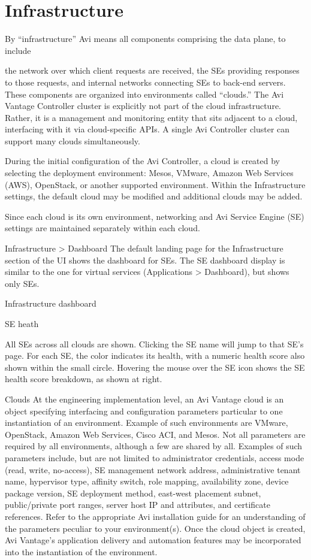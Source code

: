 \documentclass[letterpaper,10pt,english]{sphinxmanual}
\begin{document}
\section{Infrastructure}
\label{\detokenize{getting_started/infrastructure:infrastructure}}\label{\detokenize{getting_started/infrastructure::doc}}
By ``infrastructure'' Avi means all components comprising the data plane, to include

the network over which client requests are received, the SEs providing responses to those requests, and internal networks connecting SEs to back-end servers. These components are organized into environments called ``clouds.'' The Avi Vantage Controller cluster is explicitly not part of the cloud infrastructure. Rather, it is a management and monitoring entity that sits adjacent to a cloud, interfacing with it via cloud-specific APIs. A single Avi Controller cluster can support many clouds simultaneously.

During the initial configuration of the Avi Controller, a cloud is created by selecting the deployment environment: Mesos, VMware, Amazon Web Services (AWS), OpenStack, or another supported environment. Within the Infrastructure settings, the default cloud may be modified and additional clouds may be added.

Since each cloud is its own environment, networking and Avi Service Engine (SE) settings are maintained separately within each cloud.

Infrastructure \textgreater{} Dashboard
The default landing page for the Infrastructure section of the UI shows the dashboard for SEs. The SE dashboard display is similar to the one for virtual services (Applications \textgreater{} Dashboard), but shows only SEs.

Infrastructure dashboard

SE heath

All SEs across all clouds are shown. Clicking the SE name will jump to that SE's page. For each SE, the color indicates its health, with a numeric health score also shown within the small circle. Hovering the mouse over the SE icon shows the SE health score breakdown, as shown at right.

Clouds
At the engineering implementation level, an Avi Vantage cloud is an object specifying interfacing and configuration parameters particular to one instantiation of an environment. Example of such environments are VMware, OpenStack, Amazon Web Services, Cisco ACI, and Mesos. Not all parameters are required by all environments, although a few are shared by all. Examples of such parameters include, but are not limited to administrator credentials, access mode (read, write, no-access), SE management network address, administrative tenant name, hypervisor type, affinity switch, role mapping, availability zone, device package version, SE deployment method, east-west placement subnet, public/private port ranges, server host IP and attributes, and certificate references. Refer to the appropriate Avi installation guide for an understanding of the parameters peculiar to your environment(s). Once the cloud object is created, Avi Vantage's application delivery and automation features may be incorporated into the instantiation of the environment.
\end{document}
